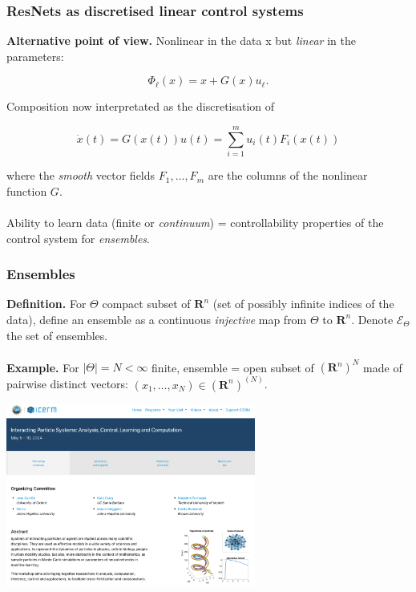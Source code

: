 \documentclass[9pt]{beamer}
\def\R{\mathbf{R}}
\begin{document}
\begin{frame}
\frametitle{\bf ResNets as discretised linear control systems}

\textbf{Alternative point of view.} Nonlinear in the data
x but \emph{linear} in the parameters:

\[ \Phi_\ell(x) = x + G(x)u_\ell. \]

Composition now interpretated as the discretisation of

\[ \dot{x}(t) = G(x(t))u(t) = \sum_{i=1}^m u_i(t)F_i(x(t)) \]

where the \emph{smooth} vector fields $F_1,\ldots,F_m$
are the columns of the nonlinear function $G$.\\
\ \\
Ability to learn data (finite or \emph{continuum}) = controllability
properties of the control system for \emph{ensembles}.

\end{frame}

\begin{frame}
\frametitle{\bf Ensembles}

\textbf{Definition.} For $\Theta$ compact
subset of $\R^n$ (set of possibly infinite indices of the data), define an ensemble as a continuous
\emph{injective} map from $\Theta$ to
$\R^n$. Denote $\mathscr{E}_\Theta$ the set of ensembles.\\
\ \\
\textbf{Example.} For $|\Theta| = N < \infty$ finite, ensemble = open subset of $(\R^n)^N$ made of
pairwise distinct vectors: $(x_1,\ldots,x_N) \in (\R^n)^{(N)}$.

\centering \includegraphics[height=6.0cm]{conf-icerm}

\end{frame}
\end{document}
